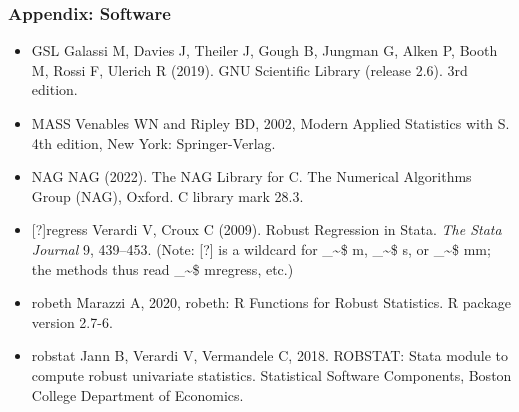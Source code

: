 \documentclass[framenumber,t]{beamer}
\makeatletter
\newcommand\code{\bgroup\@makeother\_\@makeother\~\@makeother\$\@makeother\^\@codex}
\def\@codex#1{{\normalfont\ttfamily\hyphenchar\font=-1 #1}\egroup}
\makeatother
\begin{document}
\begin{frame}
\frametitle{Appendix: Software}
    {\footnotesize
    \begin{itemize}
        \setlength\itemsep{0.25em}
        \item \alert{GSL} Galassi M, Davies J, Theiler J, Gough B, Jungman G,
            Alken P, Booth M, Rossi F, Ulerich R (2019). GNU Scientific Library
            (release 2.6). 3rd edition.
        \item \alert{MASS} Venables WN and Ripley BD, 2002, Modern Applied
            Statistics with S. 4th edition, New York: Springer-Verlag.
        \item \alert{NAG} NAG (2022). The NAG Library for C. The Numerical
            Algorithms Group (NAG), Oxford. C library mark 28.3.
        \item \alert{[?]regress} Verardi V, Croux C (2009). Robust Regression
            in Stata. \emph{The Stata Journal} 9, 439--453.
            {\scriptsize \textcolor{orange_dark}{(Note: [?] is a wildcard for
            \code{m}, \code{s}, or \code{mm}; the methods thus read
            \code{mregress}, etc.)}}
        \item \alert{robeth} Marazzi A, 2020, robeth: R Functions for
            Robust Statistics. R package version 2.7-6.
        \item \alert{robstat} Jann B, Verardi V, Vermandele C, 2018. ROBSTAT:
            Stata module to compute robust univariate statistics. Statistical
            Software Components, Boston College Department of Economics.
    \end{itemize}
    }
\end{frame}
\end{document}

